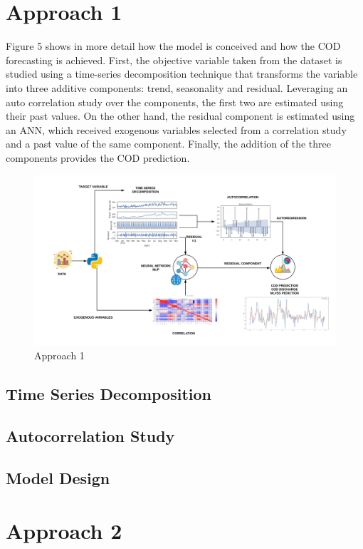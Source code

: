 \section{Approach 1}
\label{s:Approach1}

Figure 5 shows in more detail how the model is conceived and how the COD forecasting is achieved. First, the objective variable taken from the dataset is studied using a time-series decomposition technique that transforms the variable into three additive components: trend, seasonality and residual. Leveraging an auto correlation study over the components, the first two are estimated using their past values. On the other hand, the residual component is estimated using an ANN, which received exogenous variables selected from a correlation study and a past value of the same component. Finally, the addition of the three components provides the COD prediction. 

\begin{figure}[h]
\centering
\includegraphics[width=\linewidth]{figures/Ch4/Approach1.png}
\caption{Approach 1}
\label{f:Approach 1}
\end{figure}

\subsection{Time Series Decomposition}
\subsection{Autocorrelation Study}
\subsection{Model Design}

\section{Approach 2}
\label{s:Approach2}

